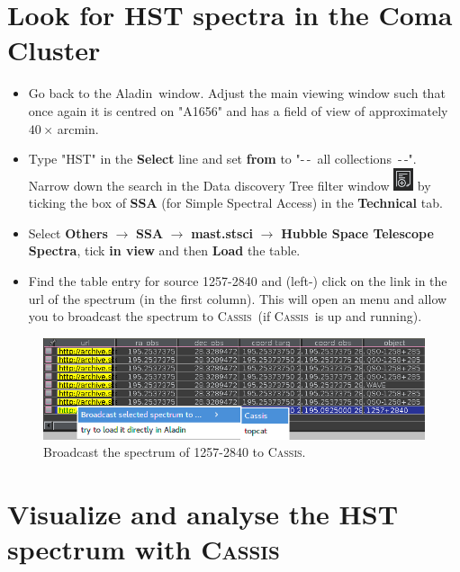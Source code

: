 \documentclass [a4paper, 12pt]{article}
\newcommand{\aladin}{{\textsc{A}{ladin}}}
\newcommand{\cassis}{{\textsc{Cassis}}}
\begin{document}
\section{Look for HST spectra in the Coma Cluster}

\begin{itemize}
\item Go back to the \aladin\ window. Adjust the main viewing window such that 
once again it is centred on "A1656" and has a field of view of approximately 
$40\times$\,arcmin. 
\item Type "HST" in the \textbf{Select} line and set \textbf{from} to "-\,-~all 
collections~-\,-". Narrow down the search in the Data discovery Tree filter 
window \includegraphics[width=0.03 
\textwidth]{../images/aladin_button_filtertree.png} by ticking the box of 
\textbf{SSA} (for Simple Spectral Access) in the \textbf{Technical} tab. 
\item Select \textbf{Others} $\rightarrow$ \textbf{SSA} $\rightarrow$ 
\textbf{mast.stsci} $\rightarrow$ \textbf{Hubble Space Telescope Spectra}, tick 
\textbf{in view} and then \textbf{Load} the table. 
\item Find the table entry for source 1257-2840 and (left-) click on the link 
in the url of the spectrum (in the first column). This will open an menu and 
allow you to broadcast the spectrum to \cassis\ (if \cassis\ is up and 
running). 
\end{itemize}
\begin{figure}[H]
    \center
    \includegraphics[width=0.6  
    \textwidth]{../images/aladin_send_HSTspec_cassis.png}
    \caption{Broadcast the spectrum of 1257-2840 to \cassis.}
    \label{fig:broadcastspectrum}
\end{figure}

\section{Visualize and analyse the HST spectrum with \cassis}
\end{document}
